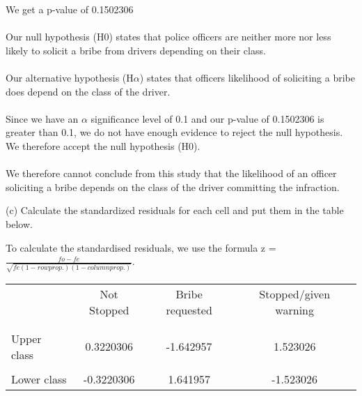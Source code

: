 \documentclass[12pt,letterpaper]{article}
\begin{document}
 

We get a p-value of 0.1502306
\\\\
Our null hypothesis (H0) states that police officers are neither more nor less likely to solicit a bribe from drivers depending on their class.
\\\\
Our alternative hypothesis (H$\alpha$) states that officers likelihood of soliciting a bribe does depend on the class of the driver. 
\\\\
Since we have an $\alpha$ significance level of 0.1 and our p-value  of 0.1502306 is greater than 0.1, we do not have enough evidence to reject the null hypothesis. We therefore accept the null hypothesis (H0).
\\\\
We therefore cannot conclude from this study that the likelihood of an officer soliciting a bribe depends on the class of the driver committing the infraction.

\newpage
(c) Calculate the standardized residuals for each cell and put them in the table below.
\vspace{1cm}

To calculate the standardised residuals, we use the formula z = \(\frac{fo-fe}{\sqrt{fe(1-row prop.)(1 - column prop.)}}\). 


 

\begin{table}[h]
	\centering
	\begin{tabular}{l | c c c }
		& Not Stopped & Bribe requested & Stopped/given warning \\
		\\[-1.8ex] 
		\hline \\[-1.8ex]
		Upper class  &0.3220306 &-1.642957&1.523026 \\
		\\
		Lower class &-0.3220306 &1.641957 &-1.523026\\
		
	\end{tabular}
\end{table}
\end{document}
